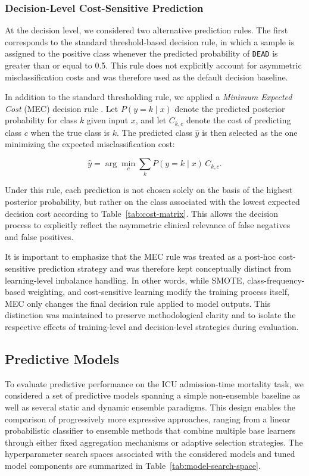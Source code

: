 \documentclass[conference]{IEEEtran}
\begin{document}
\subsubsection{Decision-Level Cost-Sensitive Prediction}

At the decision level, we considered two alternative prediction rules. The first corresponds to the standard threshold-based decision rule, in which a sample is assigned to the positive class whenever the predicted probability of \texttt{DEAD} is greater than or equal to 0.5. This rule does not explicitly account for asymmetric misclassification costs and was therefore used as the default decision baseline.

In addition to the standard thresholding rule, we applied a \textit{Minimum Expected Cost} (MEC) decision rule \cite{elkan2001}. Let \(P(y=k \mid x)\) denote the predicted posterior probability for class \(k\) given input \(x\), and let \(C_{k,c}\) denote the cost of predicting class \(c\) when the true class is \(k\). The predicted class \(\hat{y}\) is then selected as the one minimizing the expected misclassification cost:

\[
\hat{y} = \arg\min_{c} \sum_{k} P(y=k \mid x)\, C_{k,c}.
\]

Under this rule, each prediction is not chosen solely on the basis of the highest posterior probability, but rather on the class associated with the lowest expected decision cost according to Table~\ref{tab:cost-matrix}. This allows the decision process to explicitly reflect the asymmetric clinical relevance of false negatives and false positives.

It is important to emphasize that the MEC rule was treated as a post-hoc cost-sensitive prediction strategy and was therefore kept conceptually distinct from learning-level imbalance handling. In other words, while SMOTE, class-frequency-based weighting, and cost-sensitive learning modify the training process itself, MEC only changes the final decision rule applied to model outputs. This distinction was maintained to preserve methodological clarity and to isolate the respective effects of training-level and decision-level strategies during evaluation.

\subsection{Predictive Models}
To evaluate predictive performance on the ICU admission-time mortality task, we considered a set of predictive models spanning a simple non-ensemble baseline as well as several static and dynamic ensemble paradigms. This design enables the comparison of progressively more expressive approaches, ranging from a linear probabilistic classifier to ensemble methods that combine multiple base learners through either fixed aggregation mechanisms or adaptive selection strategies. The hyperparameter search spaces associated with the considered models and tuned model components are summarized in Table~\ref{tab:model-search-space}.
\end{document}
